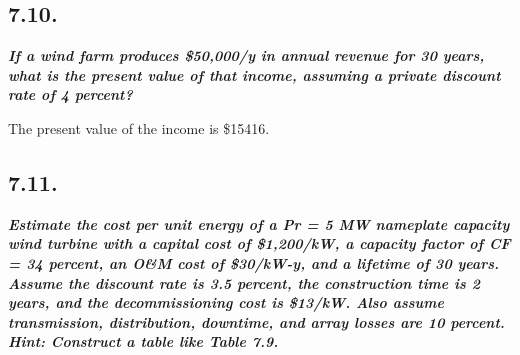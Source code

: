 \documentclass[
  letterpaper,
  DIV=11,
  numbers=noendperiod]{scrartcl}
\newenvironment{Shaded}{\begin{snugshade}}{\end{snugshade}}
\newcommand{\CommentTok}[1]{\textcolor[rgb]{0.37,0.37,0.37}{#1}}
\newcommand{\DecValTok}[1]{\textcolor[rgb]{0.68,0.00,0.00}{#1}}
\newcommand{\FloatTok}[1]{\textcolor[rgb]{0.68,0.00,0.00}{#1}}
\newcommand{\NormalTok}[1]{\textcolor[rgb]{0.00,0.23,0.31}{#1}}
\newcommand{\OperatorTok}[1]{\textcolor[rgb]{0.37,0.37,0.37}{#1}}
\newcommand{\SpecialCharTok}[1]{\textcolor[rgb]{0.37,0.37,0.37}{#1}}
\newcommand{\SpecialStringTok}[1]{\textcolor[rgb]{0.13,0.47,0.30}{#1}}
\begin{document}
\hypertarget{section-9}{%
\subsection{7.10.}\label{section-9}}

\textbf{\emph{If a wind farm produces \$50,000/y in annual revenue for
30 years, what is the present value of that income, assuming a private
discount rate of 4 percent? }}

\begin{Shaded}
\end{Shaded}

The present value of the income is \$15416.

\hypertarget{section-10}{%
\subsection{7.11.}\label{section-10}}

\textbf{\emph{Estimate the cost per unit energy of a Pr = 5 MW nameplate
capacity wind turbine with a capital cost of \$1,200/kW, a capacity
factor of CF = 34 percent, an O\&M cost of \$30/kW-y, and a lifetime of
30 years. Assume the discount rate is 3.5 percent, the construction time
is 2 years, and the decommissioning cost is \$13/kW. Also assume
transmission, distribution, downtime, and array losses are 10 percent.
Hint: Construct a table like Table 7.9. }}
\end{document}
